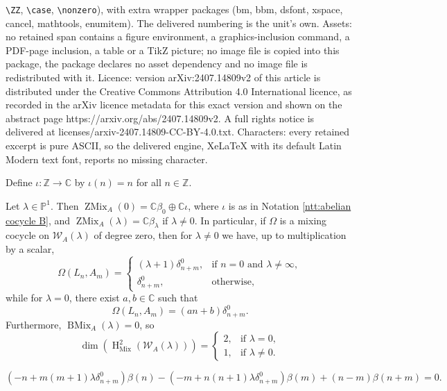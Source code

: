 \documentclass[10pt,a4paper]{amsart}
\DeclareMathOperator{\BMix}{BMix}
\DeclareMathOperator{\HH}{H}
\DeclareMathOperator{\Mix}{Mix}
\DeclareMathOperator{\ZMix}{ZMix}
\newcommand{\CC}{\mathbb{C}}
\newcommand{\PP}{\mathbb{P}}
\newcommand{\W}{\mathcal{W}}
\newcommand{\ZZ}{\mathbb{Z}}
\begin{document}
\texttt{\textbackslash ZZ}, \texttt{\textbackslash case}, \texttt{\textbackslash nonzero}), with extra wrapper packages (bm, bbm, dsfont, xspace, cancel, mathtools, enumitem). The delivered numbering is the unit's own. Assets: no retained span contains a figure environment, a graphics-inclusion command, a PDF-page inclusion, a table or a TikZ picture; no image file is copied into this package, the package declares no asset dependency and no image file is redistributed with it. Licence: version arXiv:2407.14809v2 of this article is distributed under the Creative Commons Attribution 4.0 International licence, as recorded in the arXiv licence metadata for this exact version and shown on the abstract page https://arxiv.org/abs/2407.14809v2. A full rights notice is delivered at licenses/arxiv-2407.14809-CC-BY-4.0.txt. Characters: every retained excerpt is pure ASCII, so the delivered engine, XeLaTeX with its default Latin Modern text font, reports no missing character.
\begin{Notation}\label{ntt:abelian cocycle B}
    Define $\iota \colon \ZZ \to \CC$ by $\iota(n) = n$ for all $n \in \ZZ$.
\end{Notation}

\begin{proposition}\label{prop:W_A mixing cocycles}
    Let $\lambda \in \PP^1$. Then $\ZMix_A(0) = \CC \beta_0 \oplus \CC \iota$, where $\iota$ is as in Notation \ref{ntt:abelian cocycle B}, and $\ZMix_A(\lambda) = \CC \beta_\lambda$ if $\lambda \neq 0$. In particular, if $\Omega$ is a mixing cocycle on $\W_A(\lambda)$ of degree zero, then for $\lambda \neq 0$ we have, up to multiplication by a scalar,
    $$\Omega(L_n,A_m) = \begin{cases}
        (\lambda + 1)\delta_{n+m}^0, &\text{if } n = 0 \text{ and } \lambda \neq \infty, \\
        \delta_{n+m}^0, &\text{otherwise},
    \end{cases}$$
    while for $\lambda = 0$, there exist $a,b \in \CC$ such that
    $$\Omega(L_n,A_m) = (an + b)\delta_{n+m}^0.$$
    Furthermore, $\BMix_A(\lambda) = 0$, so
    $$\dim(\HH_{\Mix}^2(\W_A(\lambda))) = \begin{cases}
        2, &\text{if } \lambda = 0,\\
        1, &\text{if } \lambda \neq 0.
    \end{cases}$$
\end{proposition}

    \begin{equation}\label{eq:mixing cocycle A}
        (-n + m(m + 1)\lambda \delta_{n+m}^0)\beta(n) - (-m + n(n + 1)\lambda \delta_{n+m}^0)\beta(m) + (n - m)\beta(n + m) = 0.
    \end{equation}
\end{document}
